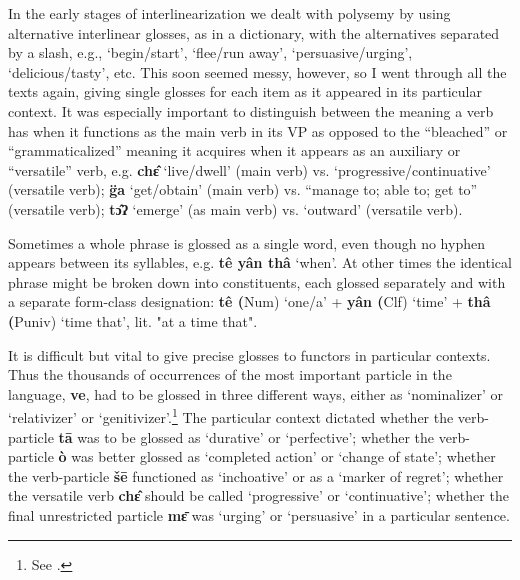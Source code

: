 In the early stages of interlinearization we dealt with polysemy by
using alternative interlinear glosses, as in a dictionary, with the
alternatives separated by a slash, e.g., `begin/start', `flee/run away',
`persuasive/urging', `delicious/tasty', etc. This soon seemed messy,
however, so I went through all the texts again, giving single glosses
for each item as it appeared in its particular context. It was
especially important to distinguish between the meaning a verb has when
it functions as the main verb in its VP as opposed to the ``bleached'' or
``grammaticalized'' meaning it acquires when it appears as an auxiliary or
``versatile'' verb, e.g. \textbf{chɛ̂} `live/dwell' (main verb) vs.
`progressive/continuative' (versatile verb); \textbf{g̈a} `get/obtain'
(main verb) vs. ``manage to; able to; get to'' (versatile verb);
\textbf{tɔ̂ʔ} `emerge' (as main verb) vs. `outward' (versatile verb).

Sometimes a whole phrase is glossed as a single word, even though no
hyphen appears between its syllables, e.g. \textbf{tê yân thâ} `when'.
At other times the identical phrase might be broken down into
constituents, each glossed separately and with a separate form-class
designation: \textbf{tê (}Num) `one/a' + \textbf{yân (}Clf) `time' +
\textbf{thâ (}Puniv) `time that', lit. "at a time that".

It is difficult but vital to give precise glosses to functors in
particular contexts. Thus the thousands of occurrences of the most
important particle in the language, \textbf{ve}, had to be glossed in
three different ways, either as `nominalizer' or `relativizer' or
`genitivizer'.\footnote{See \citet{matisoff1972}.} The particular context
dictated whether the verb-particle \textbf{tā} was to be glossed as
`durative' or `perfective'; whether the verb-particle \textbf{ò} was
better glossed as `completed action' or `change of state'; whether the
verb-particle \textbf{šē} functioned as `inchoative' or as a `marker of
regret'; whether the versatile verb \textbf{chɛ̂} should be called
`progressive' or `continuative'; whether the final unrestricted particle
\textbf{mɛ̄} was `urging' or `persuasive' in a particular sentence.


